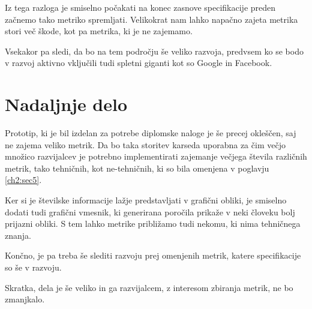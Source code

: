 \documentclass[a4paper, 12pt]{book}
\begin{document}
Iz tega razloga je smiselno počakati na konec zasnove specifikacije preden začnemo tako metriko spremljati. Velikokrat nam lahko napačno zajeta metrika stori več škode, kot pa metrika, ki je ne zajemamo.

Vsekakor pa sledi, da bo na tem področju še veliko razvoja, predvsem ko se bodo v razvoj aktivno vključili tudi spletni giganti kot so Google in Facebook. 

\section{Nadaljnje delo}
\label{ch4:sec1}

Prototip, ki je bil izdelan za potrebe diplomske naloge je še precej okleščen, saj ne zajema veliko metrik. Da bo taka storitev karseda uporabna za čim večjo množico razvijalcev je potrebno implementirati zajemanje večjega števila različnih metrik, tako tehničnih, kot ne-tehničnih, ki so bila omenjena v poglavju \ref{ch2:sec5}.

Ker si je številske informacije lažje predstavljati v grafični obliki, je smiselno dodati tudi grafični vmesnik, ki generirana poročila prikaže v neki človeku bolj prijazni obliki. S tem lahko metrike približamo tudi nekomu, ki nima tehničnega znanja.

Končno, je pa treba še slediti razvoju prej omenjenih metrik, katere specifikacije so še v razvoju.

Skratka, dela je še veliko in ga razvijalcem, z interesom zbiranja metrik, ne bo zmanjkalo.

\newpage %
\ \\
\clearpage
{}


\end{document}
